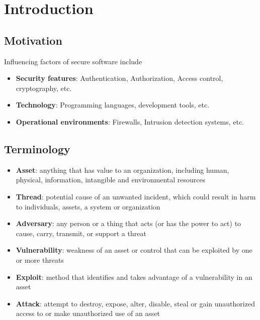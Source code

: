 \documentclass[12pt,A4]{extarticle}
\begin{document}

\disclaimer

\tableofcontents
\clearpage

\section{Introduction}
\subsection{Motivation}
Influencing factors of secure software include
\begin{itemize}
  \item{\textbf{Security features}: Authentication, Authorization, Access control, cryptography, etc.}
  \item{\textbf{Technology}: Programming languages, development tools, etc.}
  \item{\textbf{Operational environments}: Firewalls, Intrusion detection systems, etc.}
\end{itemize}

\subsection{Terminology}
\begin{itemize}
  \item{\textbf{Asset}: anything that has value to an organization, including human, physical, information, intangible and environmental resources }
  \item{\textbf{Thread}: potential cause of an unwanted incident, which could result in harm to individuals, assets, a system or organization }
  \item{\textbf{Adversary}: any person or a thing that acts (or has the power to act) to cause, carry, transmit, or support a threat \cite{ComparingAndEvaluatingCVSSBaseMetrics}}
  \item{\textbf{Vulnerability}: weakness of an asset or control that can be exploited by one or more threats }
  \item{\textbf{Exploit}: method that identifies and takes advantage of a vulnerability in an asset \cite{ComparingAndEvaluatingCVSSBaseMetrics}}
  \item{\textbf{Attack}: attempt to destroy, expose, alter, disable, steal or gain unauthorized access to or make unauthorized use of an asset }
\end{itemize} 
\end{document}
